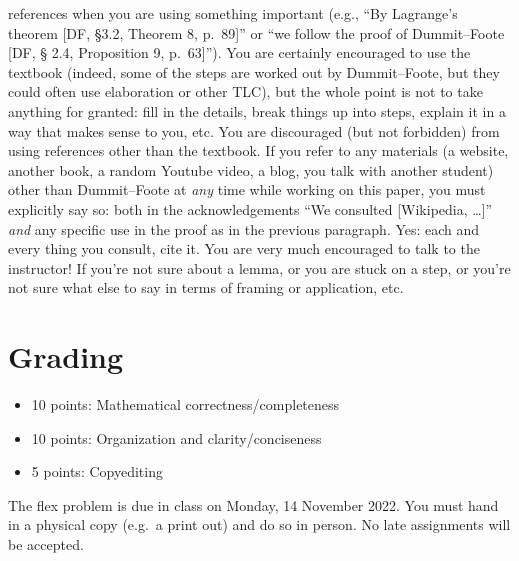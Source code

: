 \documentclass[11pt, reqno]{amsart}
\newcounter{problem}
\begin{document}
references when you are using something important (e.g., ``By Lagrange's theorem 
[DF, \S 3.2, Theorem 8, p.~89]'' or ``we follow the proof of Dummit--Foote [DF, \S 
2.4, Proposition 9, p.~63]'').  You are certainly encouraged to use the textbook 
(indeed, some of the steps are worked out by Dummit--Foote, but they could often 
use elaboration or other TLC), but the whole point is not to take anything for 
granted: fill in the details, break things up into steps, explain it in a way that 
makes sense to you, etc.  
You are discouraged (but not forbidden) from using references other than the 
textbook.  If you refer to any materials (a website, another book, a random Youtube
video, a blog, you talk with another student) other than Dummit--Foote at
\emph{any} time while working on this paper, you must explicitly say so: both in the
acknowledgements ``We consulted [Wikipedia, \ldots]'' \emph{and} any specific use in 
the proof as in the previous paragraph.  Yes: each and every thing you consult, 
cite it.  
You are very much encouraged to talk to the instructor!  If you're not sure about a
lemma, or you are stuck on a step, or you're not sure what else to say in terms of 
framing or application, etc.  
\section*{Grading}
\begin{itemize}
\item 10 points: Mathematical correctness/completeness
\item 10 points: Organization and clarity/conciseness
\item 5 points: Copyediting
\end{itemize}
The flex problem is due in class on Monday, 14 November 2022.  You must hand in a 
physical copy (e.g.\ a print out) and do so in person.  No late assignments will be
accepted.  
\vfill\newpage
\end{document}
